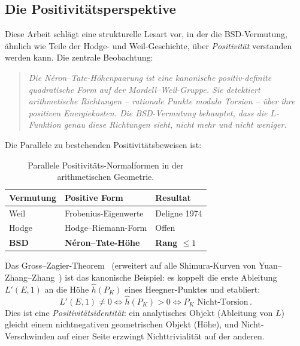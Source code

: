 \documentclass[aps,prd,twocolumn,superscriptaddress,nofootinbib,floatfix]{revtex4-2}
\theoremstyle{definition}
\theoremstyle{remark}
\begin{document}
\subsection{Die Positivitätsperspektive}

Diese Arbeit schlägt eine strukturelle Lesart vor, in der die BSD-Vermutung, ähnlich wie Teile der Hodge- und Weil-Geschichte, über \textit{Positivität} verstanden werden kann. Die zentrale Beobachtung:

\begin{quote}
\textit{Die Néron--Tate-Höhenpaarung ist eine kanonische positiv-definite quadratische Form auf der Mordell--Weil-Gruppe. Sie detektiert arithmetische \glqq Richtungen\grqq{} -- rationale Punkte modulo Torsion -- über ihre positiven Energiekosten. Die BSD-Vermutung behauptet, dass die $L$-Funktion genau diese Richtungen \glqq sieht\grqq{}, nicht mehr und nicht weniger.}
\end{quote}

Die Parallele zu bestehenden Positivitätsbeweisen ist:

\begin{table}[htbp]
\centering
\caption{Parallele Positivitäts-Normalformen in der arithmetischen Geometrie.}
\label{tab:positivity_parallels}
\begin{tabular*}{\columnwidth}{@{\extracolsep{\fill}}lll@{}}
\toprule
\textbf{Vermutung} & \textbf{Positive Form} & \textbf{Resultat} \\
\midrule
Weil & Frobenius-Eigenwerte & Deligne 1974 \\
\addlinespace
Hodge & Hodge--Riemann-Form & Offen \\
\addlinespace
\textbf{BSD} & \textbf{Néron--Tate-Höhe} & \textbf{Rang $\leq 1$} \\
\bottomrule
\end{tabular*}
\end{table}

Das Gross--Zagier-Theorem~\cite{GrossZagier1986} (erweitert auf alle Shimura-Kurven von Yuan--Zhang--Zhang~\cite{YZZ2013}) ist das kanonische Beispiel: es koppelt die erste Ableitung $L'(E,1)$ an die Höhe $\hat{h}(P_K)$ eines Heegner-Punktes und etabliert:
\begin{equation}
L'(E,1) \neq 0 \iff \hat{h}(P_K) > 0 \iff P_K \text{ Nicht-Torsion}\,.
\end{equation}
Dies ist eine \textit{Positivitätsidentität}: ein analytisches Objekt (Ableitung von $L$) gleicht einem nichtnegativen geometrischen Objekt (Höhe), und Nicht-Verschwinden auf einer Seite erzwingt Nichttrivialität auf der anderen.
\end{document}
